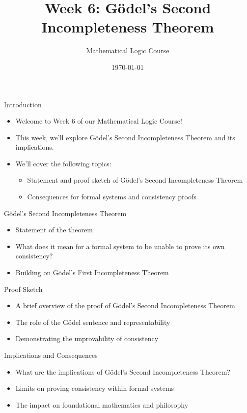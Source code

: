 \documentclass[presentation]{beamer}
\author{Mathematical Logic Course}
\date{\today}
\title{Week 6: Gödel's Second Incompleteness Theorem}
\begin{document}
\maketitle

\begin{frame}[label={sec:org5c2f079}]{Introduction}
\begin{itemize}
\item Welcome to Week 6 of our Mathematical Logic Course!
\item This week, we'll explore Gödel's Second Incompleteness Theorem and its implications.
\item We'll cover the following topics:
\begin{itemize}
\item Statement and proof sketch of Gödel's Second Incompleteness Theorem
\item Consequences for formal systems and consistency proofs
\end{itemize}
\end{itemize}
\end{frame}

\begin{frame}[label={sec:org0a61a92}]{Gödel's Second Incompleteness Theorem}
\begin{itemize}
\item Statement of the theorem
\item What does it mean for a formal system to be unable to prove its own consistency?
\item Building on Gödel's First Incompleteness Theorem
\end{itemize}
\end{frame}

\begin{frame}[label={sec:orga3be67d}]{Proof Sketch}
\begin{itemize}
\item A brief overview of the proof of Gödel's Second Incompleteness Theorem
\item The role of the Gödel sentence and representability
\item Demonstrating the unprovability of consistency
\end{itemize}
\end{frame}

\begin{frame}[label={sec:orgb8c9bc3}]{Implications and Consequences}
\begin{itemize}
\item What are the implications of Gödel's Second Incompleteness Theorem?
\item Limits on proving consistency within formal systems
\item The impact on foundational mathematics and philosophy
\end{itemize}
\end{frame}
\end{document}
